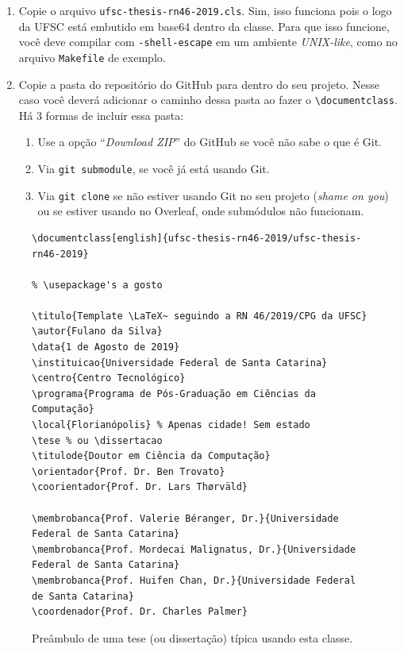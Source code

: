 \documentclass[embeddedlogo]{../ufsc-thesis-rn46-2019}
\newcommand{\lacmd}[1]{\texttt{\textbackslash{}#1}}
\begin{document}
\begin{enumerate}
  \item Copie o arquivo \texttt{ufsc-thesis-rn46-2019.cls}. Sim, isso funciona
      pois o logo da UFSC está embutido em base64 dentro da classe. Para que
        isso funcione, você deve compilar com \texttt{-shell-escape} em um
        ambiente \textit{UNIX-like}, como no arquivo \texttt{Makefile} de
        exemplo.
  \item Copie a pasta do repositório do GitHub para dentro do seu projeto.
      Nesse caso você deverá adicionar o caminho dessa pasta ao fazer o
        \lacmd{documentclass}. Há 3 formas de incluir essa pasta:
  \begin{enumerate}
    \item Use a opção ``\emph{Download ZIP}'' do GitHub se você não sabe o que
        é Git.
    \item Via \texttt{git submodule}, se você já está usando Git.
    \item Via \texttt{git clone} se não estiver usando Git no seu projeto
        (\emph{shame on you}) ou se estiver usando no Overleaf, onde submódulos
          não funcionam.
    \end{enumerate}
\end{enumerate}

\begin{figure}[tb]
  \centering
  \caption{Preâmbulo de uma tese (ou dissertação) típica usando esta classe.}
  \label{fig:preambulo}

  \begin{verbatim}
\documentclass[english]{ufsc-thesis-rn46-2019/ufsc-thesis-rn46-2019}

% \usepackage's a gosto

\titulo{Template \LaTeX~ seguindo a RN 46/2019/CPG da UFSC}
\autor{Fulano da Silva}
\data{1 de Agosto de 2019}
\instituicao{Universidade Federal de Santa Catarina}
\centro{Centro Tecnológico}
\programa{Programa de Pós-Graduação em Ciências da Computação}
\local{Florianópolis} % Apenas cidade! Sem estado
\tese % ou \dissertacao
\titulode{Doutor em Ciência da Computação}
\orientador{Prof. Dr. Ben Trovato}
\coorientador{Prof. Dr. Lars Thørväld}

\membrobanca{Prof. Valerie Béranger, Dr.}{Universidade Federal de Santa Catarina}
\membrobanca{Prof. Mordecai Malignatus, Dr.}{Universidade Federal de Santa Catarina}
\membrobanca{Prof. Huifen Chan, Dr.}{Universidade Federal de Santa Catarina}
\coordenador{Prof. Dr. Charles Palmer}
  \end{verbatim}
\end{figure}
\end{document}
